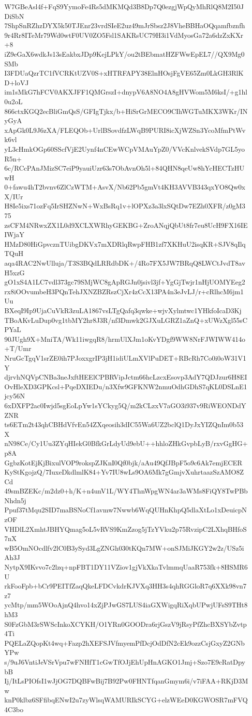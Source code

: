 W7GBeAsl4f+FqS9YymoFe4Rs5dMKMQd3B8Dp7Q0ezgjWpQyMhRlQ8M2I50JDiSbN
7ShpSnRZhzDYX5k50TJEnr23vrdSIeE2uz49mJrSbsz2J8VheBBHaOQqamfbznfh
9r4Rr8ITeMr79Wd0wtF0UV0ZO5Fsl1SAKRsUC79H3i1VdMyosGa72a6dzZxKXr+8
iZ9eGaX6wdkJs13sEakbxJDp9KejLPkY/ou2tBEbmatHZFWwEpEL7//QX9Mg0SMb
I3FDUaQzrTC1fVCRKtUZV0S+xHTRFAPY38ElnHOsjFgVE65Zm0LkGH3RlKD+loVJ
im1sMkG7hFCV0AKXJFF1QMGrszI+dnypV6A8NO4A8gHVWom5M6ksI/+g1hl0u2oL
866ctxKGQ2ecBliGmQsS/GFIgTjkx/b+HiSrGrMECO9CIhWGTuMKX3WKr/INyGyA
xApGk0L9J6zXA/FLEQOb+UrlBSovdfzLWqB9PURI8icXjWZSn3YcoMfmPtWvk6vl
yL3cHmkOGp60SScfVjE2Uynf4nCEwWCpVMAuYpZ0/VVcKnlvekSVdp7GL5yoR5n+
6c/RCcPAnJMizSC7eiP9yauiUzr63s7ObAvnOh5l+84QHN8qeUw8hYcHECTzHUwH
0+fawu4hT2bvnv6ZlCzWTM+AsvX/Nb62Pb5gmVt4KH3AVVB343qxYO8Qw0xX/IUr
H8Ie5ixs71ozFq5IrSHZNwN+WxBsRq1v+lOPXz3a3lxSQtDw7EZh0XFR/z0gM375
zsCFM4NRwxZX1L0d9XCLXWRhyGEKBG+ZroANqjQbUt8fr7eu8UcH9FX16IEIWjaY
HMzD80HiGpvcznTUibgDKVx7mXDRlqRwpFHB1zf7XKHuU2isqKR+SJV8qIlqTQuH
aqa4RAC2NwUlluja/T3S3BQdLRRdbDK+/4Ro7FX5JW7BRqQ8LWCtJvdT8avH5xzG
gO1xS4A1LC7vdl373gc79SMjWC8gApRGJn0jsivl3jf+YgGjTwjr1nHjUOMYEeg2
rx8iOOvumbeH3PQnTehJXNZBZRszCjXr4zCcX13PA4n3eJvLJ/r+cRlhcM6jm1Uu
BXeqI9Ip9UjaCuVkR3zuLA1867vsLTgQafq3qwke+wjvXylmtwc1YHkfoIcaD3Kj
TBoAKvLuDup0vg1tbMY2hr8J3R/nf3Dmwk2GJXuLGRZ1aZnQ+xUWzXgl55sCPYaL
90JUgh9X+MniTA/Wk11iwgqR8/hrmUlXJm1oKvYDgf9WW8NrFJWIWW414o+T/Umr
NruGcTgqV1srZE0ih7PJoxxgrIP3jH1idiULmXVlPuDET+RBcRh7Co0i0oW31V1Y
djrvhNQVpCNBa3neJxftHEElCPBRVipJctm66hcLzcxEsovp3AdY7QDJzur6H8EI
OvHleXD3GPKcsl+PqeDXIEDu/n3Xfw9GFKNW2nmuOdhGDhS7qKL0DSLnE1jcy56N
6xDXFP2ac0Iwjd5sgEoLpYw1sYCkyg5Q/m2kCLzxV7aGO3i937v9RiWEONDdYZNR
ts6ETm2t43qhCBHdVfvEn54ZXqeosih3dIC55Wa6UZ2bclQ1DyJxYIZQnIm0b53X
nN98Ce/Cy1Uu3ZYqHIekG0BfkGrLdyUd9ebU++hhloZHkGvpbLyB/rxvGgHG+p8A
GgbzKotEjKjBixulVOP9rokspZJKnI0Qf0bjk/aAu49QfJBpF5o9c6Ak7emjECER
KyStKgojzQ/7IuxeDkdlmlK84+Yv7IU8wLs9OA6Mk7gGmjvXuhrtaazSzAMO8ZCd
49smBZEKc/m2dz0+h/K+n4unV1L/WY4ThnWpgWN4ar3aWMs8FiQY8TwPBbNhdn5j
Ppuf37tMqu2SID7maBSNoCf1avmw7Nwwb6WqQUHnKhpQ5dlaXtLo1xDeuicpNzOF
VHDlL2XmhtJBHYQmag5oL5vRVS9KmZzog5jTzYVku2p75RvzipC2LXhqBHfoS7nX
wB5OmNOcdlfv2lC0B3ySyd3LgZNGh030tKQn7MW+onSJMiJKGY2w2z/USz5iAh3J
NytpX9IKvvo7c2lzq+npFBT1DY11VZiov1gjVkXkaTvlmmqUaaR753fk+8HSMR6U
rkFooFpb+bCr9PEITfZaqQkeLFDCvkdrKJVXq3HH3s4qhRGGloR7q6XXk98vn7z7
ycMtp/mm5WOoAjnQ4hvo14xZjPJwGS7LUS4iaGXWigqRiXqbUPwjUFsS9THt8hM3
S0FzGbM3rSWScInkoXCYKH/O1YRn0GOODra6rjGszV9jRsyPfZhcBXSYbZvtp4Ti
PQELaZQopKt4wq+Fazp2hXEFSJVfmyemPfDcjOdDfN2cEk9ozzCsjGxyZ2GNbYPw
s/9uJ6VntiJeVSrVpu7wFNHfT1cGwTfOJjEhUpHnAGKO1Jmj+Szo7E9cRatDpybB
Ij/ItLsPIOfsI1wJjOG7DQBFwBij7B92Pw0FHNTfqanGmym6i/v7iFAA+RKjD3Mw
knP0klbz6SFfibqENwI2u7zyWlsqWAMURIkSCYG+elzWEeD0KGWOSR7mFVQ4C3bo
